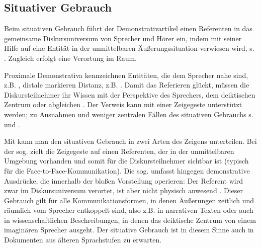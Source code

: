 \subsection{Situativer Gebrauch}\label{sec:situativ}

Beim situativen Gebrauch \parencite[auch deiktischer Gebrauch, z.B. bei][]{Bisle-Muller1991,Consten2004,Studler2011} führt der Demonstrativartikel einen Referenten in das gemeinsame Diskursuniversum von Sprecher und Hörer ein, indem mit seiner Hilfe auf eine Entität in der unmittelbaren Äußerungssituation verwiesen wird, s. . Zugleich erfolgt eine Verortung im Raum.

\begin{exe}
	\ex \label{ex:deikt} 
\end{exe}

Proximale Demonstrativa kennzeichnen Entitäten, die dem Sprecher nahe sind, z.B. , distale markieren Distanz, z.B. .
Damit das Referieren glückt, müssen die Diskursteilnehmer ihr Wissen mit der Perspektive des Sprechers, dem deiktischen Zentrum oder   \parencite{Buhler1934} abgleichen  \parencite[s. auch][327ff.]{Hoffmann2009}. Der Verweis kann mit einer Zeigegeste unterstützt werden; zu Ausnahmen und weniger zentralen Fällen des situativen Gebrauchs s. \textcite[S. 94f.]{Diessel1999} und \textcite[219--224]{Himmelmann1996}. 

Mit \textcite[]{Buhler1934} kann man den situativen Gebrauch in zwei Arten des Zeigens unterteilen. Bei der sog.  zielt die Zeigegeste auf einen Referenten, der in der unmittelbaren Umgebung vorhanden und somit für die Diskursteilnehmer sichtbar ist (typisch für die Face-to-Face-Kommunikation). Die sog.  umfasst hingegen demonstrative Ausdrücke, die innerhalb der bloßen Vorstellung operieren: Der Referent wird zwar im Diskursuniversum verortet, ist aber nicht physisch anwesend \parencite[s. auch][222]{Himmelmann1996}. Dieser Gebrauch gilt für alle Kommunikationsformen, in denen Äußerungen zeitlich und räumlich vom Sprecher entkoppelt sind, also z.B. in narrativen Texten \parencite[95]{Diessel1999} oder auch in wissenschaftlichen Beschreibungen, in denen das deiktische Zentrum von einem imaginären Sprecher ausgeht. Der situative Gebrauch ist in diesem Sinne auch in Dokumenten aus älteren Sprachstufen zu erwarten. 

